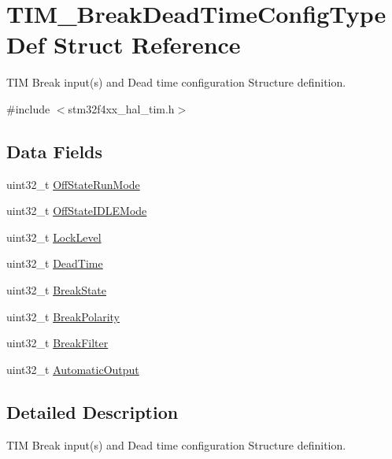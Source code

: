 \hypertarget{struct_t_i_m___break_dead_time_config_type_def}{}\section{T\+I\+M\+\_\+\+Break\+Dead\+Time\+Config\+Type\+Def Struct Reference}
\label{struct_t_i_m___break_dead_time_config_type_def}


T\+IM Break input(s) and Dead time configuration Structure definition.  




{\ttfamily \#include $<$stm32f4xx\+\_\+hal\+\_\+tim.\+h$>$}

\subsection*{Data Fields}
\begin{DoxyCompactItemize}
\item 
uint32\+\_\+t \hyperlink{struct_t_i_m___break_dead_time_config_type_def_a5e97751b5e397414e2a5120eb5cef7c6}{Off\+State\+Run\+Mode}
\item 
uint32\+\_\+t \hyperlink{struct_t_i_m___break_dead_time_config_type_def_a49f39e31ac019b9b7a20751bfd01c6c4}{Off\+State\+I\+D\+L\+E\+Mode}
\item 
uint32\+\_\+t \hyperlink{struct_t_i_m___break_dead_time_config_type_def_ab00ae9fa5c6daa6319883863dee6e40a}{Lock\+Level}
\item 
uint32\+\_\+t \hyperlink{struct_t_i_m___break_dead_time_config_type_def_a4bdc5aec84be4b728b55028491f261d4}{Dead\+Time}
\item 
uint32\+\_\+t \hyperlink{struct_t_i_m___break_dead_time_config_type_def_a8962430194b43ac28a14c96dd9cc44e6}{Break\+State}
\item 
uint32\+\_\+t \hyperlink{struct_t_i_m___break_dead_time_config_type_def_ae15ddbf3087f9a2129a52a1317339ea7}{Break\+Polarity}
\item 
uint32\+\_\+t \hyperlink{struct_t_i_m___break_dead_time_config_type_def_aad8158e694a62f6c071975ee4c2e5b6a}{Break\+Filter}
\item 
uint32\+\_\+t \hyperlink{struct_t_i_m___break_dead_time_config_type_def_ae591f2368d0be5b77d8a746e73eabe71}{Automatic\+Output}
\end{DoxyCompactItemize}


\subsection{Detailed Description}
T\+IM Break input(s) and Dead time configuration Structure definition. 

